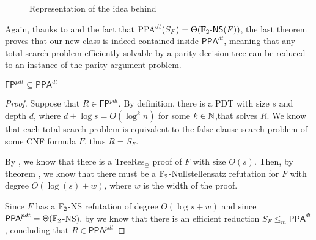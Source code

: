 \begin{figure}[H]

    \caption{Representation of the idea behind }
\end{figure}

\quad

Again, thanks to  and the fact that $\mathrm{PPA}^{dt}(S_F) = \Theta(\mathbb{F}_2\text{-}\mathsf{NS}(F))$, the last theorem proves that our new class is indeed contained inside $\mathsf{PPA}^{dt}$, meaning that any total search problem efficiently solvable by a parity decision tree can be reduced to an instance of the parity argument problem.  

\begin{theorem}
    $\mathsf{FP}^{pdt} \subseteq \mathsf{PPA}^{dt}$
\end{theorem}

\begin{proof}
 Suppose that $R \in \mathsf{FP}^{pdt}$. By definition, there is a PDT with size $s$ and depth $d$, where $d+\log s = O(\log^k n)$ for some $k \in \mathbb{N}$,that solves $R$. We know that each total search problem is equivalent to the false clause search problem of some CNF formula $F$, thus $R = S_F$.
    
 By , we know that there is a \textsf{TreeRes}$_{\oplus}$ proof of $F$ with size $O(s)$. Then, by theorem , we know that there must be a $\mathbb{F}_2$-Nullstellensatz refutation for $F$ with degree $O(\log(s) + w)$, where $w$ is the width of the proof. 
    
 Since $F$ has a $\mathbb{F}_2$-\textsf{NS} refutation of degree $O(\log s + w)$ and since $\mathsf{PPA}^{pdt} = \Theta(\mathbb{F}_2$-\textsf{NS}), by  we know that there is an efficient reduction $S_F \leq_m \mathsf{PPA}^{dt}$, concluding that $R \in \mathsf{PPA}^{pdt}$

\end{proof}

\newpage



\cleardoublepage
